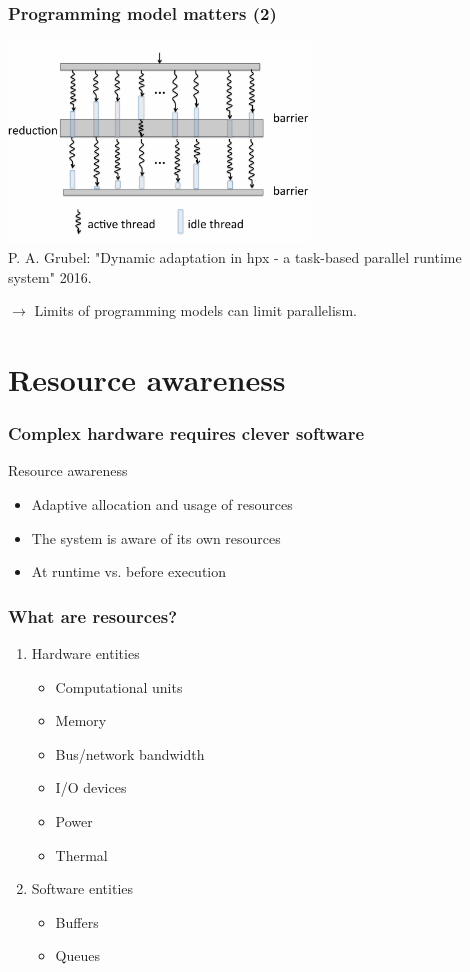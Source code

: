 \documentclass[compress]{beamer}
\begin{document}
\begin{frame}
	\frametitle{Programming model matters (2)}
	\vspace{-3mm}
	\begin{center}
		\includegraphics[width=80mm]{Figures/globalBarriersAndThreadIdleTime.png}\\
		\tiny P. A. Grubel: "Dynamic adaptation in hpx - a task-based parallel runtime system" 2016.
		\normalsize
	\end{center}
	\pause
	$\longrightarrow$ Limits of programming models can limit parallelism.
\end{frame}

\section{Resource awareness}
\begin{frame}
	\frametitle{Complex hardware requires clever software}
	\pause
	Resource awareness
	\vspace{5mm}
	\begin{itemize}
		\item Adaptive allocation and usage of resources
		\item The system is aware of its own resources
		\item At runtime vs. before execution
	\end{itemize}
\end{frame}

\begin{frame}
	\frametitle{What are resources?}
	\begin{enumerate}
		\item Hardware entities
			\begin{itemize}
				\item Computational units
				\item Memory
				\item Bus/network bandwidth
				\item I/O devices
				\item Power
				\item Thermal
			\end{itemize}
		\pause
		\item Software entities
			\begin{itemize}
				\item Buffers
				\item Queues
			\end{itemize}
	\end{enumerate}
\end{frame}
\end{document}
